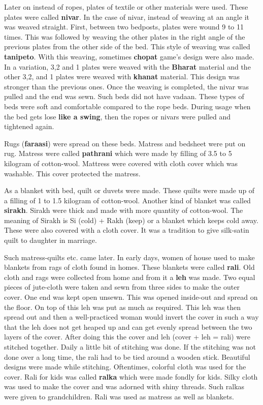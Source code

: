 Later on instead of ropes, plates of textile or other materials were used. These
plates were called \textbf{nivar}. In the case of nivar, instead of weaving at
an angle it was weaved straight. First, between two bedposts, plates
were wound 9 to 11 times. This was followed by weaving the other plates in the
right angle of the previous plates from the other side of the bed. This style of
weaving was called \textbf{tanipeto}. With this weaving, sometimes
\textbf{chopat} game's design were also made. In a variation, 3,2 and 1 plates
were weaved with the \textbf{Bharat} material and the other 3,2, and 1 plates
were weaved with \textbf{khanat} material. This design was stronger than the
previous ones. Once the weaving is completed, the nivar was pulled and the end
was sewn. Such beds did not have vadaan. These types of beds were soft and
comfortable compared to the rope beds. During usage when the bed gets lose
\textbf{like a swing}, then the ropes or nivars were pulled and tightened again.

Rugs (\textbf{faraasi}) were spread on these beds. Matress and bedsheet were put
on rug. Matress were called \textbf{pathrani} which were made by filling of 3.5
to 5 kilogram of cotton-wool. Mattress were covered with cloth cover which was
washable. This cover protected the matress. 

As a blanket with bed, quilt or duvets were made. These quilts were made up of a
filling of 1 to 1.5 kilogram of cotton-wool. Another kind of blanket was called
\textbf{sirakh}. Sirakh were thick and made with more quantity of cotton-wool.
The meaning of Sirakh is Si (cold) + Rakh (keep) or a blanket which keeps cold
away. These were also covered with a cloth cover. It was a tradition to give
silk-satin quilt to daughter in marriage. 

Such matress-quilts etc. came later. In early days, women of house used to make
blankets from rags of cloth found in homes. These blankets were called
\textbf{rali}. Old cloth and rags were collected from home and from it a
\textbf{leh} was made. Two equal pieces of jute-cloth were taken and sewn from
three sides to make the outer cover. One end was kept open unsewn. This  was
opened inside-out and spread on the floor. On top of this leh was put as much
as required. This leh was then spread out and then a well-practiced woman would
invert the cover in such a way that the leh does not get heaped up and can get
evenly spread between the two layers of the cover. After doing this the cover
and leh (cover + leh = rali) were stitched together. Daily a little bit of
stitching was done. If the stitching was not done over a long time, the rali
had to be tied around a wooden stick. Beautiful designs were made while
stitching. Oftentimes, colorful cloth was used for the cover. Rali for kids was
called \textbf{ralka} which were made fondly for kids. Silky cloth was used to
make the cover and was adorned with shiny threads. Such ralkas were given to
grandchildren. Rali was used as matress as well as blankets. 

